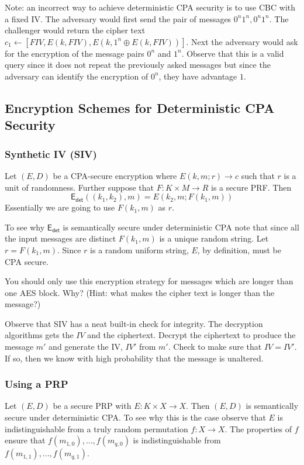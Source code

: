 \documentclass[twoside]{article}
\def\xor{\oplus}
\def\Edet{\mathsf{E_{det}}}
\begin{document}
Note: an incorrect way to achieve deterministic CPA security is to use CBC with a fixed IV. The adversary would first send the pair of messages $0^n1^n, 0^n1^n$. The challenger would return the cipher text $c_1 \leftarrow [FIV, E(k, FIV), E(k, 1^n \xor E(k, FIV))]$. Next the adversary would ask for the encryption of the message pairs $0^n$ and $1^n$. Observe that this is a valid query since it does not repeat the previously asked messages but since the adversary can identify the encryption of $0^n$, they have advantage $1$.

\subsection{Encryption Schemes for Deterministic CPA Security}

\subsubsection{Synthetic IV (SIV)}
Let $(E, D)$ be a CPA-secure encryption where $E(k, m; r) \rightarrow c$ such that $r$ is a unit of randomness. Further suppose that $F: K \times M \rightarrow R$ is a secure PRF. Then
\[ \Edet ((k_1, k_2), m) = E(k_2, m; F(k_1, m))\] 
Essentially we are going to use $F(k_1, m)$ as $r$.

To see why $\Edet$ is semantically secure under deterministic CPA note that since all the input messages are distinct $F(k_1, m)$ is a unique random string. Let $r = F(k_1, m)$. Since $r$ is a random uniform string, $E$, by definition, must be CPA secure.

You should only use this encryption strategy for messages which are longer than one AES block. Why? (Hint: what makes the cipher text is longer than the message?)

Observe that SIV has a neat built-in check for integrity. The decryption algorithms gets the $IV$ and the ciphertext. Decrypt the ciphertext to produce the message $m'$ and generate the IV, $IV'$ from $m'$. Check to make sure that $IV = IV'$. If so, then we know with high probability that the message is unaltered. 

\subsubsection{Using a PRP}
Let $(E, D)$ be a secure PRP with $E: K \times X \rightarrow X$. Then $(E, D)$ is semantically secure under deterministic CPA. To see why this is the case observe that $E$ is indistinguishable from a truly random permutation $f: X \rightarrow X$. The properties of $f$ ensure that $f(m_{1, 0}), ..., f(m_{q, 0})$ is indistinguishable from $f(m_{1,1}), ..., f(m_{q, 1})$.
\end{document}
